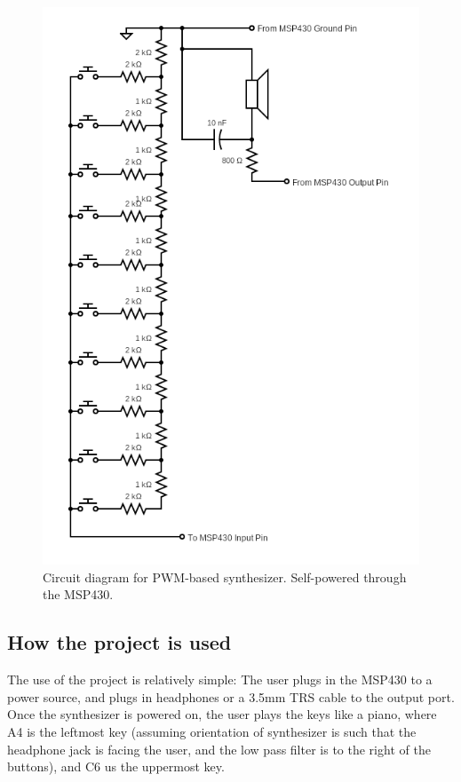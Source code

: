 \begin{figure}
    \centering
    \includegraphics[width = 0.8 \textwidth]{circuit.png}
    \caption{Circuit diagram for PWM-based synthesizer. Self-powered through the MSP430. }
    \label{fig:circuit_diagram}
\end{figure}






\subsection{How the project is used}\label{subsec:how-the-project-is-used}

The use of the project is relatively simple: The user plugs in the MSP430 to a power source, and plugs in headphones or a 3.5mm TRS cable to the output port. Once the synthesizer is powered on, the user plays the keys like a piano, where A4 is the leftmost key (assuming orientation of synthesizer is such that the headphone jack is facing the user, and the low pass filter is to the right of the buttons), and C6 us the uppermost key. 


